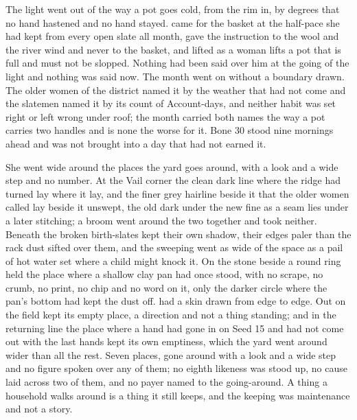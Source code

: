 The light went out of  the way a pot goes cold, from the rim in, by degrees that no hand hastened and no hand stayed.  came for the basket at the half-pace she had kept from every open slate all month, gave the instruction to the wool and the river wind and never to the basket, and lifted  as a woman lifts a pot that is full and must not be slopped. Nothing had been said over him at the going of the light and nothing was said now. The month went on without a boundary drawn. The older women of the district named it by the weather that had not come and the slatemen named it by its count of Account-days, and neither habit was set right or left wrong under  roof; the month carried both names the way a pot carries two handles and is none the worse for it. Bone 30 stood nine mornings ahead and was not brought into a day that had not earned it.

She went wide around the places the yard goes around, with a look and a wide step and no number. At the Vail corner the clean dark line where the  ridge had turned lay where it lay, and the finer grey hairline beside it that the older women called  lay beside it unswept, the old dark under the new fine as a seam lies under a later stitching; a broom went around the two together and took neither. Beneath  the broken birth-slates kept their own shadow, their edges paler than the rack dust sifted over them, and the sweeping went as wide of the space as a pail of hot water set where a child might knock it. On the stone beside  a round ring held the place where a shallow clay pan had once stood, with no scrape, no crumb, no print, no chip and no word on it, only the darker circle where the pan's bottom had kept the dust off.  had a skin drawn from edge to edge. Out on  the field kept its empty place, a direction and not a thing standing; and in the returning line the place where a hand had gone in on Seed 15 and had not come out with the last hands kept its own emptiness, which the yard went around wider than all the rest. Seven places, gone around with a look and a wide step and no figure spoken over any of them; no eighth likeness was stood up, no cause laid across two of them, and no payer named to the going-around. A thing a household walks around is a thing it still keeps, and the keeping was maintenance and not a story.

